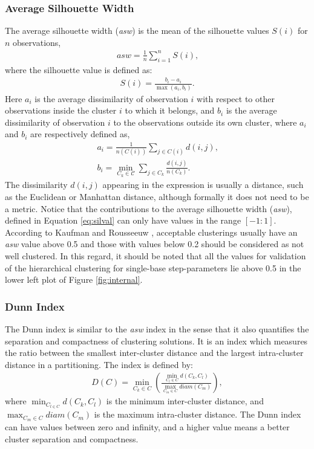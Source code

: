 \subsubsection{Average Silhouette Width}
The  average  silhouette  width  (\textit{asw})  is  the  mean  of  the
silhouette values $S(i)$ for $n$ observations,
\begin{gather}
\textit{asw} = \frac{1}{n} \sum_{i=1}^{n} S(i) \text{,}
\end{gather}  
where the silhouette value is defined as:
\begin{gather}
\label{eq:silval}  
S(i) = \frac{b_{i}-a_{i}}{\max(a_{i},b_{i})} \text{.}
\end{gather}
Here  $a_{i}$ is  the average  dissimilarity of  observation  $i$ with
respect  to other  observations inside  the  cluster $i$  to which  it
belongs, and  $b_{i}$ is the average dissimilarity  of observation $i$
to the observations outside its own cluster, where $a_i$ and $b_i$ are
respectively defined as,
\begin{gather}
a_{i} = \frac{1}{n(C(i))} \sum_{j \in C(i)} d(i,j) \text{,}\\
b_{i}     =    \min_{C_{k}     \in     \mathcal{C}}    \sum_{j     \in
  C_{k}}\frac{d(i,j)}{n(C_{k})} \text{.}
\end{gather}  
The dissimilarity  $d(i,j)$ appearing in  the expression is  usually a
distance,  such  as  the  Euclidean or  Manhattan  distance,  although
formally  it  does  not  need   to  be  a  metric.   Notice  that  the
contributions to the  average silhouette width (\textit{asw}), defined
in  Equation  \ref{eq:silval}  can  only  have  values  in  the  range
$[-1:1]$.   According  to  Kaufman and  Rousseeuw  \cite{kaufman1990},
acceptable clusterings  usually have  an \textit{asw} value  above 0.5
and  those with  values below  0.2 should  be considered  as  not well
clustered. In this regard, it should  be noted that all the values for
validation   of   the    hierarchical   clustering   for   single-base
step-parameters  lie  above 0.5  in  the  lower  left plot  of  Figure
\ref{fig:internal}.

\subsubsection{Dunn Index}
The Dunn index is similar to  the \textit{asw} index in the sense that
it  also  quantifies  the  separation and  compactness  of  clustering
solutions.  It  is an  index  which  measures  the ratio  between  the
smallest inter-cluster distance and the largest intra-cluster distance
in a partitioning.  The index is defined by:
\begin{gather}
D(C) = \min_{C_{k} \in C} \left(  \frac{\min_{C_{l} \in C}
  d(C_{k},C_{l})}{\max_{C_{m} \in C} diam(C_{m})} \right) ,
\end{gather}
where $\min_{C_{l \in C}} d(C_{k},C_{l})$ is the minimum inter-cluster
distance,  and  $\max_{C_{m}  \in   C}  diam(C_{m})$  is  the  maximum
intra-cluster distance.   The Dunn index can have  values between zero
and infinity, and a higher value means a better cluster separation and
compactness.

